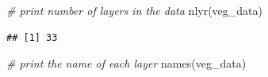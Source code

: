 \documentclass[
  12pt,
]{book}
\newenvironment{Shaded}{\begin{snugshade}}{\end{snugshade}}
\newcommand{\CommentTok}[1]{\textcolor[rgb]{0.56,0.35,0.01}{\textit{#1}}}
\newcommand{\FunctionTok}[1]{\textcolor[rgb]{0.00,0.00,0.00}{#1}}
\newcommand{\NormalTok}[1]{#1}
\begin{document}
\begin{Shaded}
\begin{Highlighting}[]
\CommentTok{\# print number of layers in the data}
\FunctionTok{nlyr}\NormalTok{(veg\_data)}
\end{Highlighting}
\end{Shaded}

\begin{verbatim}
## [1] 33
\end{verbatim}

\begin{Shaded}
\begin{Highlighting}[]
\CommentTok{\# print the name of each layer}
\FunctionTok{names}\NormalTok{(veg\_data)}
\end{Highlighting}
\end{Shaded}
\end{document}
